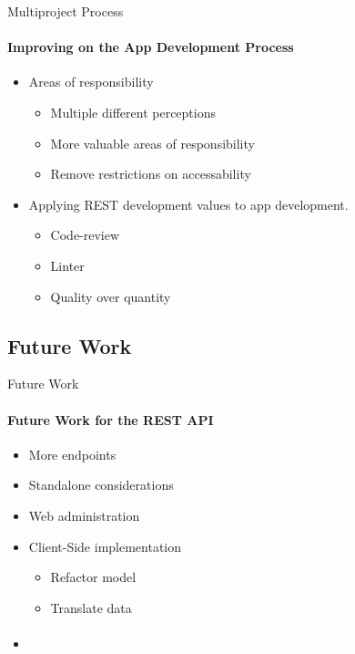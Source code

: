     \begin{frame}[t]{Multiproject Process}\framesubtitle{Improving on the App Development Process}
        \begin{itemize}
            \item Areas of responsibility
            \begin{itemize}
                \item Multiple different perceptions
                \item More valuable areas of responsibility
                \item Remove restrictions on accessability
            \end{itemize}
            \item Applying REST development values to app development.
            \begin{itemize}
                \item Code-review
                \item Linter
                \item Quality over quantity
            \end{itemize}
        \end{itemize}
    \end{frame}

    \subsection{Future Work}
    \begin{frame}[t]{Future Work}\framesubtitle{Future Work for the REST API}
        \begin{itemize}
            \item More endpoints
            \item Standalone considerations
            \item Web administration
            \item Client-Side implementation
            \begin{itemize}
                \item Refactor model
                \item Translate data
            \end{itemize}
        \end{itemize}
    \end{frame}

    \begin{frame}[t]{}\framesubtitle{}
        \begin{itemize}
            \item
        \end{itemize}
    \end{frame}
